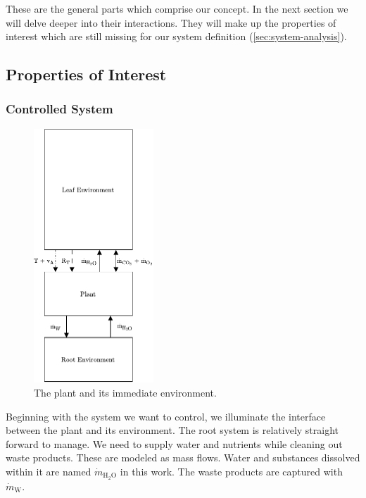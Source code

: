 These are the general parts which comprise our concept.
In the next section we will delve deeper into their interactions.
They will make up the properties of interest which are still missing for our system definition (\ref{sec:system-analysis}).

\subsection{Properties of Interest}
\label{sub:prop-of-interest}

\subsubsection{Controlled System}
\begin{figure}
	\includegraphics[width=0.4\textwidth]{img/system_analysis/controlled-system.pdf}
	\caption{The plant and its immediate environment.}
	\label{wfig:controlled-system}
\end{figure} 

Beginning with the system we want to control, we illuminate the interface between the plant and its environment.
The root system is relatively straight forward to manage.
We need to supply water and nutrients while cleaning out waste products.
These are modeled as mass flows.
Water and substances dissolved within it are named $\dot{m}_{\text{H}_2\text{O}}$ in this work.
The waste products are captured with $\dot{m}_\text{W}$.

